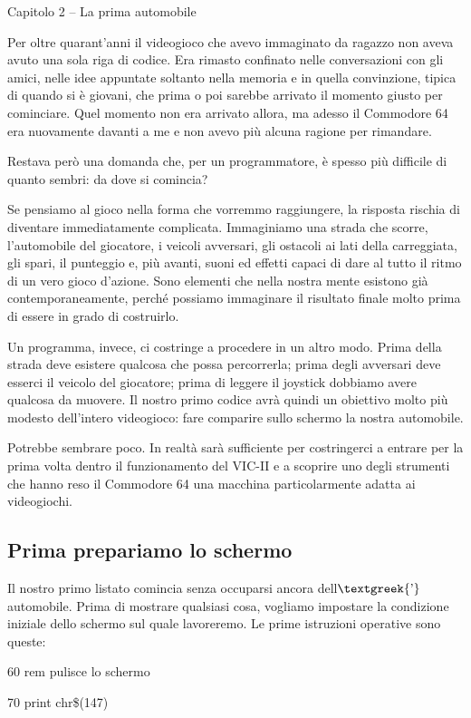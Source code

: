 \documentclass{article}
\author{utente}
\date{2026-08-20}
\begin{document}
Capitolo 2 – La prima automobile

Per oltre quarant'anni il videogioco che avevo immaginato da ragazzo non aveva avuto una sola riga di codice. Era
rimasto confinato nelle conversazioni con gli amici, nelle idee appuntate soltanto nella memoria e in quella
convinzione, tipica di quando si è giovani, che prima o poi sarebbe arrivato il momento giusto per cominciare. Quel
momento non era arrivato allora, ma adesso il Commodore 64 era nuovamente davanti a me e non avevo più alcuna ragione
per rimandare.

Restava però una domanda che, per un programmatore, è spesso più difficile di quanto sembri: da dove si comincia?

Se pensiamo al gioco nella forma che vorremmo raggiungere, la risposta rischia di diventare immediatamente complicata.
Immaginiamo una strada che scorre, l'automobile del giocatore, i veicoli avversari, gli ostacoli ai lati della
carreggiata, gli spari, il punteggio e, più avanti, suoni ed effetti capaci di dare al tutto il ritmo di un vero gioco
d'azione. Sono elementi che nella nostra mente esistono già contemporaneamente, perché possiamo immaginare il risultato
finale molto prima di essere in grado di costruirlo.

Un programma, invece, ci costringe a procedere in un altro modo. Prima della strada deve esistere qualcosa che possa
percorrerla; prima degli avversari deve esserci il veicolo del giocatore; prima di leggere il joystick dobbiamo avere
qualcosa da muovere. Il nostro primo codice avrà quindi un obiettivo molto più modesto dell'intero videogioco: fare
comparire sullo schermo la nostra automobile.

Potrebbe sembrare poco. In realtà sarà sufficiente per costringerci a entrare per la prima volta dentro il funzionamento
del VIC-II e a scoprire uno degli strumenti che hanno reso il Commodore 64 una macchina particolarmente adatta ai
videogiochi.

\subsection{Prima prepariamo lo schermo}
Il nostro primo listato comincia senza occuparsi ancora dell$\text{\textgreek{’}}$automobile. Prima di mostrare
qualsiasi cosa, vogliamo impostare la condizione iniziale dello schermo sul quale lavoreremo. Le prime istruzioni
operative sono queste:

60 rem pulisce lo schermo

70 print chr\$(147)
\end{document}

